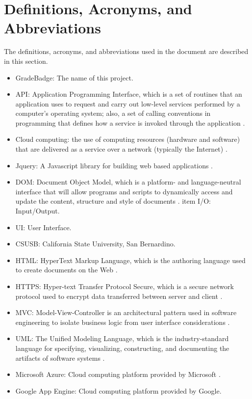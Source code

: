 \section{Definitions, Acronyms, and Abbreviations}

The definitions, acronyms, and abbreviations used in the document are described in this section.

\begin{itemize}
\item GradeBadge: The name of this project.
\item API: Application Programming Interface, which is a set of routines that an application uses to request and carry out low-level services performed by a computer's operating system; also, a set of calling conventions in programming that defines how a service is invoked through the application \cite{API}.
\item Cloud computing: the use of computing resources (hardware and software) that are delivered as a service over a network (typically the Internet) \cite{cloudcomputing}.
\item Jquery: A Javascript library for building web based applications \cite{JQuery}.
\item DOM: Document Object Model, which is a platform- and language-neutral interface that will allow programs and scripts to dynamically access and update the content, structure and style of documents \cite{DOM}.
item I/O: Input/Output.
\item UI: User Interface.
\item CSUSB: California State University, San Bernardino.
\item HTML: HyperText Markup Language, which is the authoring language used to create documents on the Web \cite{w3}.
\item HTTPS: Hyper-text Transfer Protocol Secure, which is a secure network protocol used to encrypt data transferred  between server and client \cite{https}.
\item MVC\label{def:mvc}: Model-View-Controller is an architectural pattern used in software engineering to isolate business logic from user interface considerations \cite{MVC}.
\item UML: The Unified Modeling Language, which is the industry-standard language for specifying, visualizing, constructing, and documenting the artifacts of software systems \cite{uml}.
\item Microsoft Azure: Cloud computing platform provided by Microsoft \cite{MicrosoftAzure}.
\item Google App Engine: Cloud computing platform provided by Google.

\end{itemize}

